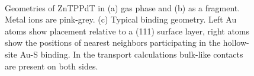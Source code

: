 \documentclass[aip,jcp,a4paper,reprint,floatfix,superscriptaddress]{revtex4-1}
\begin{document}
\begin{figure}
\hfill
{}\\
\caption{Geometries of ZnTPPdT in (a) gas phase and (b) as a fragment. Metal ions are pink-grey. (c) Typical binding geometry. Left Au atoms show placement relative to a (111) surface layer, right atoms show the positions of nearest neighbors participating in the hollow-site Au-S binding. In the transport calculations bulk-like contacts are present on both sides.}\label{fg:4geometries}
\end{figure}
\end{document}
